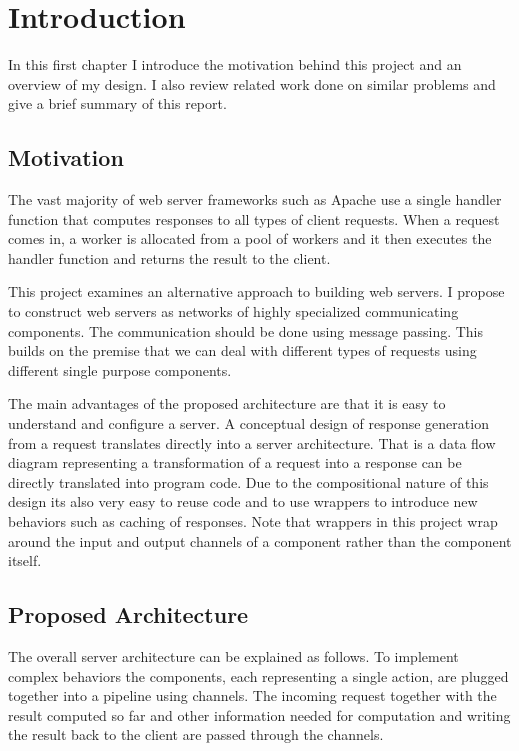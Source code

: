 \section{Introduction}
In this first chapter I introduce the motivation behind this project and 
an overview of my design. I also review related work done on similar
problems and give a brief summary of this report. 

\subsection{Motivation}
The vast majority of web server frameworks such as Apache
use a single handler function that
computes responses to all types of client requests. When a request comes in, a 
worker is allocated from a pool of workers and it then executes the handler function
and returns the result to the client.

This project examines an alternative approach to building web servers. 
I propose to construct web servers as networks of highly specialized 
communicating components. The communication should be done using
message passing. This builds on the premise that we can deal
with different types of requests using different single purpose components.

The main advantages of the proposed architecture are that it is easy to understand
and configure a server. A conceptual design of response generation from a request translates 
directly into a server architecture. That is a data flow diagram 
representing a transformation
of a request into a response can be directly translated into program code.
Due to the compositional nature of this design its also very easy to reuse code
and to use wrappers to introduce new behaviors such as caching of responses.
Note that wrappers in this project wrap around the input and output channels
of a component rather than the component itself.

\subsection{Proposed Architecture}
The overall server architecture can be explained as follows.
To implement complex behaviors the components, each representing 
a single action, are plugged together into a pipeline using channels. 
The incoming
request together with the result computed so far and other 
information needed for computation and writing the result back to the client
are passed through the channels.

